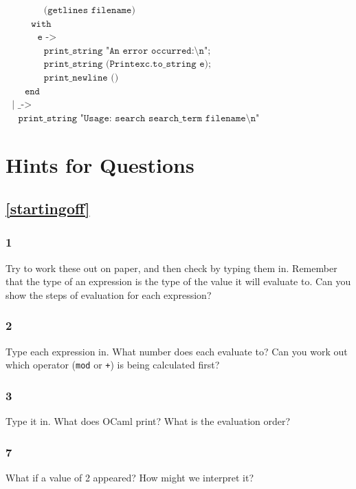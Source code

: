 \documentclass[]{book}
\newcommand{\smspace}{\vspace{4mm}}
\begin{document}
\begin{center}
{\begin{minipage}{0.9\textwidth}
$\texttt{~~~~~~~~~~~~(getlines filename)}$\\
$\texttt{~~~~~~~~with}$\\
$\texttt{~~~~~~~~~~e ->}$\\
$\texttt{~~~~~~~~~~~~print\_string "An error occurred:\textbackslash n";}$\\
$\texttt{~~~~~~~~~~~~print\_string (Printexc.to\_string e);}$\\
$\texttt{~~~~~~~~~~~~print\_newline ()}$\\
$\texttt{~~~~~~end}$\\
$\texttt{~~| \_ ->}$\\
$\texttt{~~~~print\_string "Usage:\ search search\_term filename\textbackslash n"}$\vphantom{g}
\end{minipage}}
\end{center}
\smspace

\cleardoublepage
\flushbottom
\chapter{Hints for Questions}
\label{hints}
\section*{\ref{startingoff}\\ }
\subsection*{1}
Try to work these out on paper, and then check by typing them in. Remember that the type of an expression is the type of the value it will evaluate to. Can you show the steps of evaluation for each expression?

\subsection*{2}
Type each expression in. What number does each evaluate to? Can you work out which operator (\texttt{mod} or \texttt{+}) is being calculated first?

\subsection*{3}
Type it in. What does OCaml print? What is the evaluation order?

\subsection*{7}
What if a value of 2 appeared? How might we interpret it?
\end{document}
